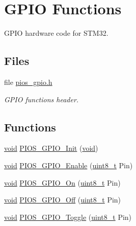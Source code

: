 \hypertarget{group___p_i_o_s___g_p_i_o}{\section{G\-P\-I\-O Functions}
\label{group___p_i_o_s___g_p_i_o}
}


G\-P\-I\-O hardware code for S\-T\-M32.  


\subsection*{Files}
\begin{DoxyCompactItemize}
\item 
file \hyperlink{pios__gpio_8h}{pios\-\_\-gpio.\-h}
\begin{DoxyCompactList}\small\item\em G\-P\-I\-O functions header. \end{DoxyCompactList}\end{DoxyCompactItemize}
\subsection*{Functions}
\begin{DoxyCompactItemize}
\item 
\hyperlink{group___n_a_m_e_ga18028b8badbf1ea7e704ccac3c488e82}{void} \hyperlink{group___p_i_o_s___g_p_i_o_ga0a04c19c7662b5b1bab7af58cc95ea71}{P\-I\-O\-S\-\_\-\-G\-P\-I\-O\-\_\-\-Init} (\hyperlink{group___n_a_m_e_ga18028b8badbf1ea7e704ccac3c488e82}{void})
\item 
\hyperlink{group___n_a_m_e_ga18028b8badbf1ea7e704ccac3c488e82}{void} \hyperlink{group___p_i_o_s___g_p_i_o_ga1ea220ce8e0a9081fc1d33e11062305e}{P\-I\-O\-S\-\_\-\-G\-P\-I\-O\-\_\-\-Enable} (\hyperlink{stdint_8h_aba7bc1797add20fe3efdf37ced1182c5}{uint8\-\_\-t} Pin)
\item 
\hyperlink{group___n_a_m_e_ga18028b8badbf1ea7e704ccac3c488e82}{void} \hyperlink{group___p_i_o_s___g_p_i_o_ga289b80b649d2822e23e75e50f08aacff}{P\-I\-O\-S\-\_\-\-G\-P\-I\-O\-\_\-\-On} (\hyperlink{stdint_8h_aba7bc1797add20fe3efdf37ced1182c5}{uint8\-\_\-t} Pin)
\item 
\hyperlink{group___n_a_m_e_ga18028b8badbf1ea7e704ccac3c488e82}{void} \hyperlink{group___p_i_o_s___g_p_i_o_ga6c44e966e9da101b26f64778d517787a}{P\-I\-O\-S\-\_\-\-G\-P\-I\-O\-\_\-\-Off} (\hyperlink{stdint_8h_aba7bc1797add20fe3efdf37ced1182c5}{uint8\-\_\-t} Pin)
\item 
\hyperlink{group___n_a_m_e_ga18028b8badbf1ea7e704ccac3c488e82}{void} \hyperlink{group___p_i_o_s___g_p_i_o_gadf86d97ffad85f2bfb36da79c7d84145}{P\-I\-O\-S\-\_\-\-G\-P\-I\-O\-\_\-\-Toggle} (\hyperlink{stdint_8h_aba7bc1797add20fe3efdf37ced1182c5}{uint8\-\_\-t} Pin)
\end{DoxyCompactItemize}



